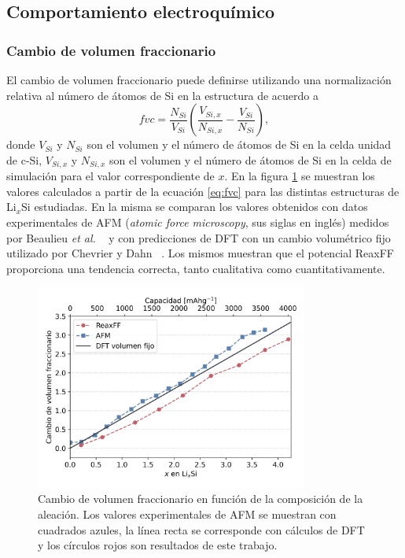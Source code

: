 \subsection{Comportamiento electroquímico}

\subsubsection{Cambio de volumen fraccionario}

El cambio de volumen fraccionario puede definirse utilizando una normalización 
relativa al número de átomos de Si en la estructura de acuerdo a
\begin{equation}\label{eq:fvc}
    fvc = \frac{N_{Si}}{V_{Si}} \left( \frac{V_{Si,x}}{N_{Si,x}} - \frac{V_{Si}}{N_{Si}} \right),
\end{equation}
donde $V_{Si}$ y $N_{Si}$ son el volumen y el número de átomos de Si en la celda
unidad de c-Si, $V_{Si,x}$ y $N_{Si,x}$ son el volumen y el número de átomos de Si
en la celda de simulación para el valor correspondiente de $x$. En la figura
\ref{fig:fvc} se muestran los valores calculados a partir de la ecuación 
\ref{eq:fvc} para las distintas estructuras de Li$_x$Si estudiadas. En la misma 
se comparan los valores obtenidos con datos experimentales de AFM (\textit{atomic 
force microscopy}, sus siglas en inglés) medidos por Beaulieu \textit{et al.} 
~\cite{beaulieu2003} y con predicciones de DFT con un cambio volumétrico fijo 
utilizado por Chevrier y Dahn ~\cite{chevrier2009}. Los mismos muestran que el
potencial ReaxFF proporciona una tendencia correcta, tanto cualitativa como 
cuantitativamente.
\begin{figure}[th]
    \centering
    \includegraphics[width=0.8\textwidth]{Silicio/caracterizacion/resultados/electroquimica/fvc.png}
    \caption{Cambio de volumen fraccionario en función de la composición de la 
    aleación. Los valores experimentales de AFM se muestran con cuadrados azules, 
    la línea recta se corresponde con cálculos de DFT y los círculos rojos son 
    resultados de este trabajo.}
    \label{fig:fvc}
\end{figure}

